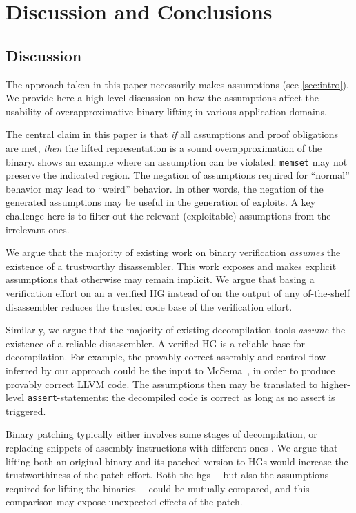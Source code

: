 \chapter{Discussion and Conclusions}\label{ch:hg-discussion}


\section{Discussion}
The approach taken in this paper necessarily makes assumptions (see \cref{sec:intro}).
We provide here a high-level discussion on how the assumptions affect the usability of overapproximative binary lifting in various application domains.
\begin{description}[style=unboxed,leftmargin=0cm,noitemsep,topsep=0pt]
  \item[Security Analysis] The central claim in this paper is that \emph{if} all assumptions and  proof obligations are met, \emph{then} the lifted representation is a sound overapproximation of the binary.  shows an example where an assumption can be violated: \texttt{memset} may not preserve the indicated region.
  The negation of assumptions required for ``normal'' behavior may lead to ``weird'' behavior.
  In other words, the negation of the generated assumptions may be useful in the generation of exploits.
  A key challenge here is to filter out the relevant (exploitable) assumptions from the irrelevant ones.
  \item[Binary Verification] We argue that the majority of existing work on binary verification \emph{assumes} the existence of a trustworthy disassembler.
  This work exposes and makes explicit assumptions that otherwise may remain implicit.
  We argue that basing a verification effort on an a verified HG instead of on the output of any of-the-shelf disassembler reduces the trusted code base of the verification effort.
  \item[Decompilation] Similarly, we argue that the majority of existing decompilation tools \emph{assume} the existence of a reliable disassembler.
  A verified HG is a reliable base for decompilation.
  For example, the provably correct assembly and control flow inferred by our approach could be the input to McSema~\cite{dinaburg2014mcsema}, in order to produce provably correct LLVM code.
  The assumptions then may be translated to higher-level \texttt{assert}-statements: the decompiled code is correct as long as no assert is triggered.
  \item[Patching] Binary patching typically either involves some stages of decompilation, or replacing snippets of assembly instructions with different ones \autocite{duck2020binary}.
  We argue that lifting both an original binary and its patched version to HGs would increase the trustworthiness of the patch effort.
  Both the \acp{hg} --~but also the assumptions required for lifting the binaries~-- could be mutually compared, and this comparison may expose unexpected effects of the patch.
\end{description}


